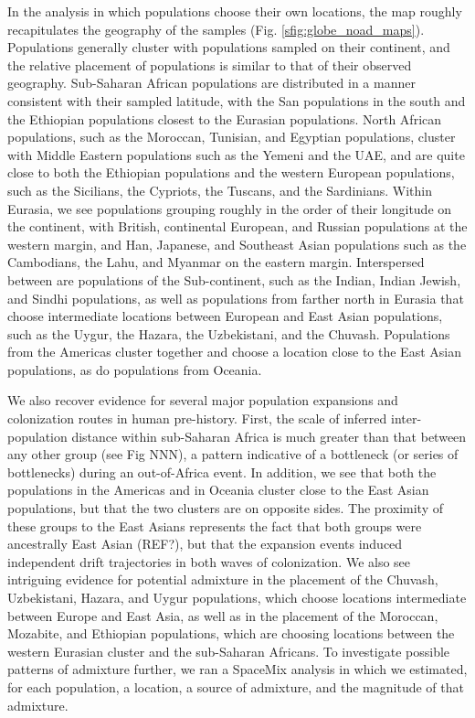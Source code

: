 \documentclass[12pt]{article}
\begin{document}
In the analysis in which populations choose their own locations, the map roughly recapitulates the geography of the samples (Fig. \ref{sfig:globe_noad_maps}).  Populations generally cluster with populations sampled on their continent, and the relative placement of populations is similar to that of their observed geography.  Sub-Saharan African populations are distributed in a manner consistent with their sampled latitude, with the San populations in the south and the Ethiopian populations closest to the Eurasian populations.  North African populations, such as the Moroccan, Tunisian, and Egyptian populations, cluster with Middle Eastern populations such as the Yemeni and the UAE, and are quite close to both the Ethiopian populations and the western European populations, such as the Sicilians, the Cypriots, the Tuscans, and the Sardinians.  Within Eurasia, we see populations grouping roughly in the order of their longitude on the continent, with British, continental European, and Russian populations at the western margin, and Han, Japanese, and Southeast Asian populations such as the Cambodians, the Lahu, and Myanmar on the eastern margin.  Interspersed between are populations of the Sub-continent, such as the Indian, Indian Jewish, and Sindhi populations, as well as populations from farther north in Eurasia that choose intermediate locations between European and East Asian populations, such as the Uygur, the Hazara, the Uzbekistani, and the Chuvash.  Populations from the Americas cluster together and choose a location close to the East Asian populations, as do populations from Oceania.

We also recover evidence for several major population expansions and colonization routes in human pre-history.  First, the scale of inferred inter-population distance within sub-Saharan Africa is much greater than that between any other group (see Fig NNN), a pattern indicative of a bottleneck (or series of bottlenecks) during an out-of-Africa event.  In addition, we see that both the populations in the Americas and in Oceania cluster close to the East Asian populations, but that the two clusters are on opposite sides.  The proximity of these groups to the East Asians represents the fact that both groups were ancestrally East Asian (REF?), but that the expansion events induced independent drift trajectories in both waves of colonization.  We also see intriguing evidence for potential admixture in the placement of the Chuvash, Uzbekistani, Hazara, and Uygur populations, which choose locations intermediate between Europe and East Asia, as well as in the placement of the Moroccan, Mozabite, and Ethiopian populations, which are choosing locations between the western Eurasian cluster and the sub-Saharan Africans.  To investigate possible patterns of admixture further, we ran a SpaceMix analysis in which we estimated, for each population, a location, a source of admixture, and the magnitude of that admixture.
\end{document}

